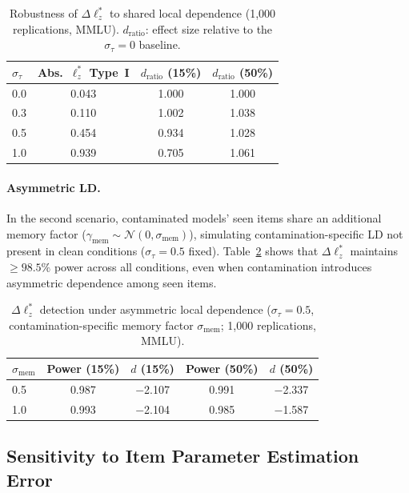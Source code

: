 \begin{table}[t]
\centering
\caption{Robustness of $\Delta\ell_z^*$ to shared local dependence (1,000 replications, MMLU). $d_{\text{ratio}}$: effect size relative to the $\sigma_\tau{=}0$ baseline.}
\label{tab:ld_shared}
\footnotesize
\begin{tabular}{@{}lccc@{}}
\toprule
$\sigma_\tau$ & Abs.\ $\ell_z^*$ Type~I & $d_{\text{ratio}}$ (15\%) & $d_{\text{ratio}}$ (50\%) \\
\midrule
0.0 & 0.043 & 1.000 & 1.000 \\
0.3 & 0.110 & 1.002 & 1.038 \\
0.5 & 0.454 & 0.934 & 1.028 \\
1.0 & 0.939 & 0.705 & 1.061 \\
\bottomrule
\end{tabular}
\end{table}

\paragraph{Asymmetric LD.}
In the second scenario, contaminated models' seen items share an additional memory factor ($\gamma_{\text{mem}} \sim \mathcal{N}(0, \sigma_{\text{mem}})$), simulating contamination-specific LD not present in clean conditions ($\sigma_\tau{=}0.5$ fixed).
Table~\ref{tab:ld_asym} shows that $\Delta\ell_z^*$ maintains ${\geq}98.5\%$ power across all conditions, even when contamination introduces asymmetric dependence among seen items.

\begin{table}[t]
\centering
\caption{$\Delta\ell_z^*$ detection under asymmetric local dependence ($\sigma_\tau{=}0.5$, contamination-specific memory factor $\sigma_{\text{mem}}$; 1,000 replications, MMLU).}
\label{tab:ld_asym}
\footnotesize
\begin{tabular}{@{}lcccc@{}}
\toprule
$\sigma_{\text{mem}}$ & Power (15\%) & $d$ (15\%) & Power (50\%) & $d$ (50\%) \\
\midrule
0.5 & 0.987 & $-$2.107 & 0.991 & $-$2.337 \\
1.0 & 0.993 & $-$2.104 & 0.985 & $-$1.587 \\
\bottomrule
\end{tabular}
\end{table}

\subsection{Sensitivity to Item Parameter Estimation Error}
\label{app:param_perturb}

